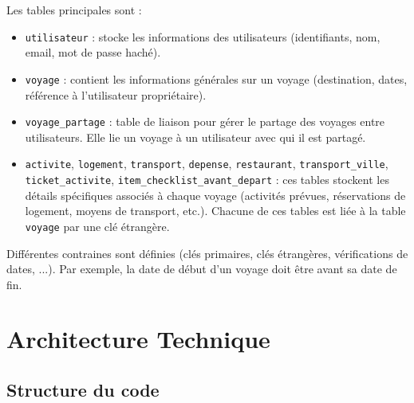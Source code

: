 \documentclass[a4paper,12pt]{article}
\begin{document}
Les tables principales sont :
\begin{itemize}
    \item \texttt{utilisateur} : stocke les informations des utilisateurs (identifiants, nom, email, mot de passe haché).
    \item \texttt{voyage} : contient les informations générales sur un voyage (destination, dates, référence à l'utilisateur propriétaire).
    \item \texttt{voyage\_partage} : table de liaison pour gérer le partage des voyages entre utilisateurs. Elle lie un voyage à un utilisateur avec qui il est partagé.
    \item \texttt{activite}, \texttt{logement}, \texttt{transport}, \texttt{depense}, \texttt{restaurant}, \texttt{transport\_ville}, \texttt{ticket\_activite}, \texttt{item\_checklist\_avant\_depart} : ces tables stockent les détails spécifiques associés à chaque voyage (activités prévues, réservations de logement, moyens de transport, etc.). Chacune de ces tables est liée à la table \texttt{voyage} par une clé étrangère.
\end{itemize}
Différentes contraines sont définies (clés primaires, clés étrangères, vérifications de dates, ...). Par exemple, la date de début d'un voyage doit être avant sa date de fin.

\section{Architecture Technique}

\subsection{Structure du code}
\end{document}
